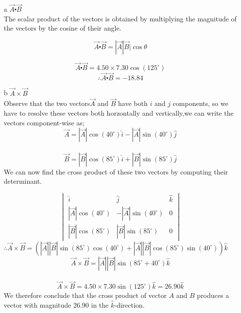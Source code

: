 \documentclass[10pt,a4paper]{article}
\begin{document}
\begin{itemize}
\item[a] $\overrightarrow{A}\centerdot\overrightarrow{B}$\\
The scalar product of the vectors is obtained by multiplying the magnitude of the vectors by the cosine of their angle.

$$\overrightarrow{A}\centerdot\overrightarrow{B}
=|\overrightarrow{A}|\overrightarrow{B}|\cos\theta$$

$$\overrightarrow{A}\centerdot\overrightarrow{B}=4.50\times7.30\cos\left(125^\circ\right)$$
$$\therefore \overrightarrow{A}\centerdot\overrightarrow{B}= -18.84$$

\item[b]$\overrightarrow{A}\times\overrightarrow{B}$\\
Observe that the two vectors$\overrightarrow{A}$ and $\overrightarrow{B}$ have both $i$ and $j$ components, so we have to resolve these vectors both horzontally and vertically,we can write the vectors component-wise as;\\

$$\overrightarrow{A}=|\overrightarrow{A}|\cos\left(40^\circ\right)\hat{i}-|\overrightarrow{A}|\sin\left(40^\circ\right)\hat{j}$$\\
$$\overrightarrow{B}=|\overrightarrow{B}|\cos\left(85^\circ\right)\hat{i}+|\overrightarrow{B}|\sin\left(85^\circ\right)\hat{j}$$
We can now find the cross product of these two vectors by computing their determinant.

\begin{equation}
\begin{vmatrix}
\hat{i}& \hat{j} & \hat{k} \\ 
|\overrightarrow{A}|\cos\left(40^\circ\right) & -|\overrightarrow{A}|\sin\left(40^\circ\right) & 0\\ 
|\overrightarrow{B}|\cos\left(85^\circ\right) & |\overrightarrow{B}|\sin\left(85^\circ\right) & 0 
\end{vmatrix} 
\end{equation}
$\therefore \overrightarrow{A}\times\overrightarrow{B}=\left(|\overrightarrow{A}||\overrightarrow{B}|\sin\left(85^\circ\right)\cos\left(40^\circ\right)+|\overrightarrow{A}||\overrightarrow{B}|\cos\left(85^\circ\right)\sin\left(40^\circ\right)\right)\hat{k}$\\
$$\overrightarrow{A}\times\overrightarrow{B}=|\overrightarrow{A}||\overrightarrow{B}|\sin\left(85^\circ+40^\circ\right)\hat{k}$$\\
$$\overrightarrow{A}\times\overrightarrow{B}=4.50\times7.30\sin\left(125^\circ\right)\hat{k}=26.90\hat{k}$$
We therefore conclude that the cross product of vector $A$ and $B$ produces a vector with magnitude 26.90 in the $\hat{k}$-direction.

\end{itemize}
\end{document}
